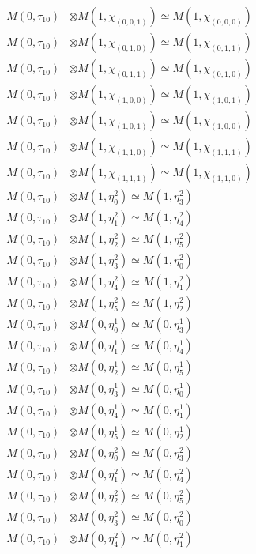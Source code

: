\begin{align*}
M(0,\tau_{10}) &\otimes M(1,\chi_{(0,0,1)}) \simeq M(1,\chi_{(0,0,0)}) \\
M(0,\tau_{10}) &\otimes M(1,\chi_{(0,1,0)}) \simeq M(1,\chi_{(0,1,1)}) \\
M(0,\tau_{10}) &\otimes M(1,\chi_{(0,1,1)}) \simeq M(1,\chi_{(0,1,0)}) \\
M(0,\tau_{10}) &\otimes M(1,\chi_{(1,0,0)}) \simeq M(1,\chi_{(1,0,1)}) \\
M(0,\tau_{10}) &\otimes M(1,\chi_{(1,0,1)}) \simeq M(1,\chi_{(1,0,0)}) \\
M(0,\tau_{10}) &\otimes M(1,\chi_{(1,1,0)}) \simeq M(1,\chi_{(1,1,1)}) \\
M(0,\tau_{10}) &\otimes M(1,\chi_{(1,1,1)}) \simeq M(1,\chi_{(1,1,0)}) \\
M(0,\tau_{10}) &\otimes M(1,\eta^{2}_{0}) \simeq M(1,\eta^{2}_{3}) \\
M(0,\tau_{10}) &\otimes M(1,\eta^{2}_{1}) \simeq M(1,\eta^{2}_{4}) \\
M(0,\tau_{10}) &\otimes M(1,\eta^{2}_{2}) \simeq M(1,\eta^{2}_{5}) \\
M(0,\tau_{10}) &\otimes M(1,\eta^{2}_{3}) \simeq M(1,\eta^{2}_{0}) \\
M(0,\tau_{10}) &\otimes M(1,\eta^{2}_{4}) \simeq M(1,\eta^{2}_{1}) \\
M(0,\tau_{10}) &\otimes M(1,\eta^{2}_{5}) \simeq M(1,\eta^{2}_{2}) \\
M(0,\tau_{10}) &\otimes M(0,\eta^{1}_{0}) \simeq M(0,\eta^{1}_{3}) \\
M(0,\tau_{10}) &\otimes M(0,\eta^{1}_{1}) \simeq M(0,\eta^{1}_{4}) \\
M(0,\tau_{10}) &\otimes M(0,\eta^{1}_{2}) \simeq M(0,\eta^{1}_{5}) \\
M(0,\tau_{10}) &\otimes M(0,\eta^{1}_{3}) \simeq M(0,\eta^{1}_{0}) \\
M(0,\tau_{10}) &\otimes M(0,\eta^{1}_{4}) \simeq M(0,\eta^{1}_{1}) \\
M(0,\tau_{10}) &\otimes M(0,\eta^{1}_{5}) \simeq M(0,\eta^{1}_{2}) \\
M(0,\tau_{10}) &\otimes M(0,\eta^{2}_{0}) \simeq M(0,\eta^{2}_{3}) \\
M(0,\tau_{10}) &\otimes M(0,\eta^{2}_{1}) \simeq M(0,\eta^{2}_{4}) \\
M(0,\tau_{10}) &\otimes M(0,\eta^{2}_{2}) \simeq M(0,\eta^{2}_{5}) \\
M(0,\tau_{10}) &\otimes M(0,\eta^{2}_{3}) \simeq M(0,\eta^{2}_{0}) \\
M(0,\tau_{10}) &\otimes M(0,\eta^{2}_{4}) \simeq M(0,\eta^{2}_{1}) \\

\end{align*}
